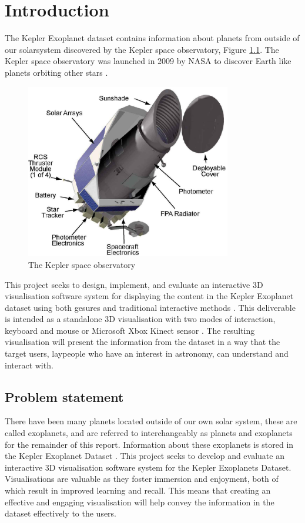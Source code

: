 \chapter{Introduction}\label{C:intro}
The Kepler Exoplanet dataset \cite{datasetphl} \cite{dataset}  contains information about planets from outside of
our solarsystem discovered by the Kepler space observatory, Figure
\ref{fig:keplerTele}. The Kepler space observatory was launched in 2009 by NASA
to discover Earth like planets orbiting other stars \cite{keplerTele}.

\begin{figure}[H]
  \centering
      \includegraphics[width=0.8\textwidth]{images/keplerTele.jpg}
  \caption{The Kepler space observatory}  
    \label{fig:keplerTele}
\end{figure}

This project seeks to design, implement, and evaluate an interactive 3D
visualisation software system for displaying the content in the Kepler
Exoplanet dataset using both gesures and traditional interactive methods
. This deliverable is intended as a standalone
3D visualisation with two modes of interaction, keyboard and mouse or Microsoft
Xbox Kinect sensor \cite{kinect}. The resulting visualisation will present the
information from the dataset in a way that the target users, laypeople who have
an
interest in astronomy, can understand and interact with.
\section{Problem statement}
There have been many planets located outside of our own solar system,
these are called exoplanets, and are referred to interchangeably as planets and
exoplanets for the remainder of this report. Information about these exoplanets
is stored in the Kepler Exoplanet Dataset
. This project seeks to develop and evaluate an interactive 3D
visualisation software system for the Kepler Exoplanets Dataset. Visualisations
are valuable as they foster immersion and enjoyment, both of which result in
improved learning and recall. This means that
creating an effective and engaging visualisation will help convey the
information
in the dataset effectively to the users.

